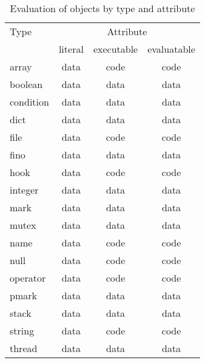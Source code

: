 \begin{table}[htb]
\begin{center}
\begin{tabular}{|l|c|c|c|}
\hline
Type		& \multicolumn{3}{|c|}{Attribute}	\\
\cline{2-4}
		& literal & executable & evaluatable	\\
\hline \hline
array		& data	& code	& code	\\
\hline
boolean		& data	& data	& data	\\
\hline
condition	& data	& data	& data	\\
\hline
dict		& data	& data	& data	\\
\hline
file		& data	& code	& code	\\
\hline
fino		& data	& data	& data	\\
\hline
hook		& data	& code	& code	\\
\hline
integer		& data	& data	& data	\\
\hline
mark		& data	& data	& data	\\
\hline
mutex		& data	& data	& data	\\
\hline
name		& data	& code	& code	\\
\hline
null		& data	& code	& code	\\
\hline
operator	& data	& code	& code	\\
\hline
pmark		& data	& data	& data	\\
\hline
stack		& data	& data	& data	\\
\hline
string		& data	& code	& code	\\
\hline
thread		& data	& data	& data	\\
\hline
\end{tabular}
\end{center}
\caption{\label{eval-act}
Evaluation of objects by type and attribute}
\end{table}

